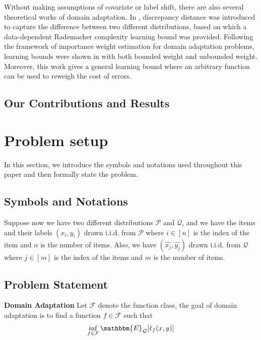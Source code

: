 \documentclass{article}
\theoremstyle{definition}
\begin{document}
Without making assumptions of covariate or label shift, there are also several theoretical works of domain adaptation. In \cite{mansour-colt09-domain}, discrepancy distance was introduced to capture the difference between two different distributions, based on which a data-dependent Rademacher complexity learning bound was provided. Following the framework of importance weight estimation for domain adaptation problems, learning bounds were shown in \cite{cortes-nips10-learning} with both bounded weight and unbounded weight. Moreover, this work gives a general learning bound where an arbitrary function can be used to reweigh the cost of errors.





\cite{Ji-ml13-differential}
\cite{wang-ecml18-differentially}
\cite{chen-aistat19-renyi}

\cite{wang-uai18-revisiting}

\subsection{Our Contributions and Results}
% 

\section{Problem setup}
In this section, we introduce the symbols and notations used throughout this paper and then formally state the problem.
\subsection{Symbols and Notations}
Suppose now we have two different distributions $\mathcal{P}$ and $\mathcal{Q}$, and we have the items and their labels $(x_i,y_i)$ drawn i.i.d. from $\mathcal{P}$ where $i\in [n]$ is the index of the item and $n$ is the number of items. Also, we have $(\hat{x_j},\hat{y_j})$ drawn i.i.d. from $\mathcal{Q}$ where $j\in [m]$ is the index of the items and $m$ is the number of items.

\subsection{Problem Statement}
\textbf{Domain Adaptation}
Let $\mathcal{F}$ denote the function class, the goal of domain adaptation is to find a function $f\in \mathcal{F}$ such that
\begin{align*}
\inf_{f\in \mathcal{F}} \mathbbm{E}_{\mathcal{Q}}[ \ell_f (x,y)]
\end{align*}
\end{document}
